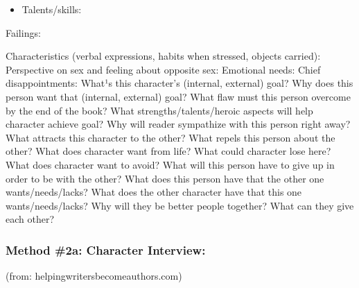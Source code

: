 \documentclass[openleft,oneside,showtrims]{memoir}
\begin{document}
\begin{itemize}
\begin{itemize}
\begin{itemize}
\begin{itemize}
\begin{itemize}
\item Talents/skills:
\end{itemize}

Failings:

Characteristics (verbal expressions, habits when stressed, objects carried):
Perspective on sex and feeling about opposite sex: Emotional needs:
Chief disappointments:
What¹s this character's (internal, external) goal?
Why does this person want that (internal, external) goal?
What flaw must this person overcome by the end of the book?
What strengths/talents/heroic aspects will help character achieve goal?
Why will reader sympathize with this person right away?
What attracts this character to the other?
What repels this person about the other?
What does character want from life?
What could character lose here?
What does character want to avoid?
What will this person have to give up in order to be with the other?
What does this person have that the other one wants/needs/lacks?
What does the other character have that this one wants/needs/lacks?
Why will they be better people together? What can they give each other?
\end{itemize}
\end{itemize}
\end{itemize}
\end{itemize}

\subsubsection*{Method \#2a: Character Interview:}
\label{sec:orgc184d1a}

(from: helpingwritersbecomeauthors.com)
\end{document}
